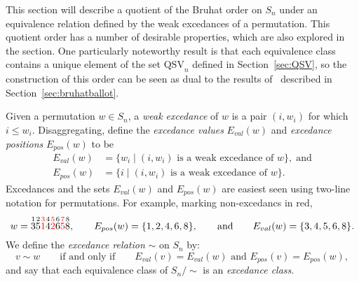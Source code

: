 \documentclass[12pt]{amsart}
\theoremstyle{definition}
\theoremstyle{remark}
\numberwithin{equation}{section}
\newcommand{\QSV}{\mathrm{QSV}}
\newcommand{\EP}{E_{pos}}
\newcommand{\EV}{E_{val}}
\begin{document}
This section will describe a quotient of the Bruhat order on $S_{n}$ under an equivalence relation defined by the weak excedances of a permutation.  
This quotient order has a number of desirable properties, which are also explored in the section.  
One particularly noteworthy result is that each equivalence class contains a unique element of the set $\QSV_{n}$ defined in Section~\ref{sec:QSV}, so the construction of this order can be seen as dual to the results of~\cite{GobetWilliams} described in Section~\ref{sec:bruhatballot}.  

Given a permutation $w \in S_{n}$, a \emph{weak excedance} of $w$ is a pair $(i, w_{i})$ for which $i \le w_{i}$.  Disaggregating, define the \emph{excedance values} $\EV(w)$ and \emph{excedance positions} $\EP(w)$ to be
\begin{align*}
\EV(w) &= \{ w_{i} \;|\; \text{$(i, w_{i})$ is a weak excedance of $w$}\},\;\text{and} \\[0.5em]
\EP(w) &= \{ i  \;|\; \text{$(i, w_{i})$ is a weak excedance of $w$}\}.
\end{align*}
Excedances and the sets $\EV(w)$ and $\EP(w)$ are easiest seen using two-line notation for permutations.  For example, marking non-excedancs in red,
\[
w = \overset{1}{3} \overset{2}{5} {\color{red} \overset{3}{1}} \overset{4}{4} {\color{red} \overset{5}{2}} \overset{6}{6} {\color{red} \overset{7}{5}} \overset{8}{8},
\qquad
\EP(w) = \{1, 2, 4, 6, 8\},\qquad\text{and}\qquad
\EV(w) = \{3, 4, 5, 6, 8\}.
\]
We define the \emph{excedance relation} $\sim$ on $S_{n}$ by:
\begin{equation}
\label{eq:excednacerel}
v \sim w \qquad\text{if and only if} \qquad \text{$\EV(v) = \EV(w)$ and $\EP(v) = \EP(w)$},
\end{equation}
and say that each equivalence class of $S_{n}/\sim$ is an \emph{excedance class}.
\end{document}
